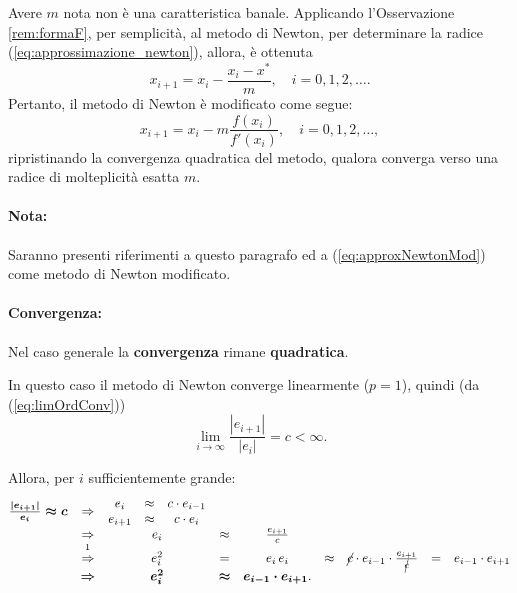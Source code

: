 Avere $m$ nota non è una caratteristica banale. Applicando l'Osservazione \ref{rem:formaF}, per semplicità, al metodo di Newton, per determinare la radice (\ref{eq:approssimazione_newton}), allora, è ottenuta
\begin{equation*}
	x_{i+1}=x_i-\frac{x_i-x^*}{m}, \quad i=0,1,2,\hdots.
\end{equation*}
Pertanto, il metodo di Newton è modificato come segue:
\begin{equation}\label{eq:approxNewtonMod}
	x_{i+1}=x_i-m\frac{f(x_i)}{f'(x_i)}, \quad i=0,1,2,\hdots,
\end{equation}
ripristinando la convergenza quadratica del metodo, qualora converga verso una radice di molteplicità esatta $m$.

\paragraph{Nota:} Saranno presenti riferimenti a questo paragrafo ed a (\ref{eq:approxNewtonMod}) come metodo di Newton modificato.

\paragraph{Convergenza:} Nel caso generale la \textbf{convergenza} rimane \textbf{quadratica}.

In questo caso il metodo di Newton converge linearmente ($p=1$), quindi (da (\ref{eq:limOrdConv}))
\begin{equation*}
	\underset{i\to\infty}{\lim}{\frac{|e_{i+1}|}{|e_i|}} = c<\infty.
\end{equation*}

Allora, per $i$ sufficientemente grande:
\begin{equation*}
	\begin{matrix}
		\boldsymbol{\frac{|e_{i+1}|}{e_i}\approx c}&\Rightarrow&
		\begin{matrix}
			e_i &\approx& c\cdot e_{i-1}\\
			e_{i+1}&\approx& c\cdot e_i
		\end{matrix}\\
		&\Rightarrow& e_i &\approx& \frac{e_{i+1}}{c}\\
		&\overset{\footnotemark}{\Rightarrow}& e_i^2&=&e_i\,e_i&\approx&\cancel{c}\cdot e_{i-1}\cdot \frac{e_{i+1}}{\cancel{c}}&=&e_{i-1}\cdot e_{i+1}\\
		&\boldsymbol\Rightarrow&\boldsymbol{e_i^2}&\boldsymbol\approx& \boldsymbol{e_{i-1}\cdot e_{i+1}}.
	\end{matrix}
\end{equation*}

